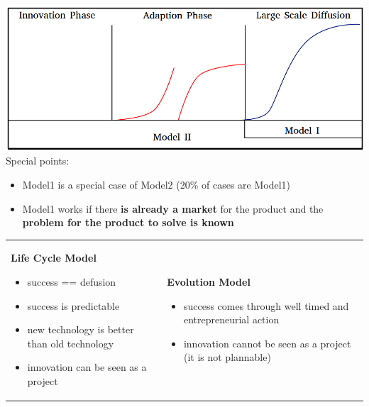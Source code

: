 \documentclass[a4paper]{article}
\begin{document}
		\includegraphics[width=400pt]{img/patternOfDiffusionModel.png}\\
		Special points:
		\begin{itemize}
		\item Model1 is a special case of Model2 (20\% of cases are Model1) 
		\item Model1 works if there {\bf is already a market} for the product and the {\bf problem for 
		the product to solve is known}
		\end{itemize}
		\begin{tabular}{ll}
			\begin{minipage}[t]{0.4\textwidth}
				{\bf Life Cycle Model}
				\begin{itemize}
				\setlength{\itemsep}{-3pt}
				\item success == defusion
				\item success is predictable
				\item new technology is better than old technology
				\item innovation can be seen as a project
				\end{itemize}
			\end{minipage}
			&
			\begin{minipage}[t]{0.4\textwidth}
				{\bf Evolution Model}
				\begin{itemize}
				\setlength{\itemsep}{-3pt}
				\item success comes through well timed and entrepreneurial action
				\item innovation cannot be seen as a project (it is not plannable)
				\end{itemize}
			\end{minipage}
		\end{tabular}
\end{document}
